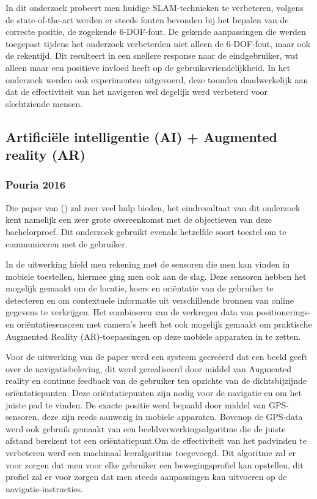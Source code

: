 In dit onderzoek probeert men huidige SLAM-technieken te verbeteren, volgens de state-of-the-art werden er steeds fouten bevonden bij het bepalen van de correcte positie, de zogekende 6-DOF-fout. De gekende aanpassingen die werden toegepast tijdens het onderzoek verbeterden niet alleen de 6-DOF-fout, maar ook de rekentijd. Dit resulteert in een snellere response naar de eindgebruiker, wat alleen maar een positieve invloed heeft op de gebruiksvriendelijkheid. In het onderzoek werden ook experimenten uitgevoerd, deze toonden daadwerkelijk aan dat de effectiviteit van het navigeren wel degelijk werd verbeterd voor slechtziende mensen.

\subsection{Artificiële intelligentie (AI) + Augmented reality (AR)}
\subsubsection{Pouria 2016}
Die paper van \textcite{Pouria2016} () zal zeer veel hulp bieden, het eindresultaat van dit onderzoek kent namelijk een zeer grote overeenkomst met de objectieven van deze bachelorproef. Dit onderzoek gebruikt evenals hetzelfde soort toestel om te communiceren met de gebruiker.

In de uitwerking hield men rekening met de sensoren die men kan vinden in mobiele toestellen, hiermee ging men ook aan de slag. Deze sensoren hebben het mogelijk gemaakt om de locatie, koers en oriëntatie van de gebruiker te detecteren en om contextuele informatie uit verschillende bronnen van online gegevens te verkrijgen. Het combineren van de verkregen data van positionerings- en oriëntatiesensoren met camera's heeft het ook mogelijk gemaakt om praktische Augmented Reality (AR)-toepassingen op deze mobiele apparaten in te zetten. 

Voor de uitwerking van de paper werd een systeem gecreëerd dat een beeld geeft over de navigatiebeleving, dit werd gerealiseerd door middel van Augmented reality en continue feedback van de gebruiker ten opzichte van de dichtsbijzijnde oriëntatiepunten. Deze oriëntatiepunten zijn nodig voor de navigatie en om het juiste pad te vinden. De exacte positie werd bepaald door middel van GPS-sensoren, deze zijn reeds aanwezig in mobiele apparaten. Bovenop de GPS-data werd ook gebruik gemaakt van een beeldverwerkingsalgoritme die de juiste afstand berekent tot een oriëntatiepunt.Om de effectiviteit van het padvinden te verbeteren werd een machinaal leeralgoritme toegevoegd. Dit algoritme zal er voor zorgen dat men voor elke gebruiker een bewegingsprofiel kan opstellen, dit profiel zal er voor zorgen dat men steeds aanpassingen kan uitvoeren op de navigatie-instructies.

